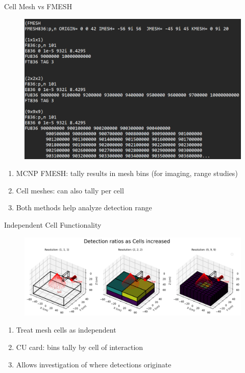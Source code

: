 \documentclass[10pt,hyperref={colorlinks,citecolor=blue,urlcolor=peking_blue,linkcolor=}]{beamer}
\theoremstyle{plain}
\begin{document}
\begin{frame}{Cell Mesh vs FMESH}
\begin{figure}[Cell Mesh vs FMESH code]
\begin{center}
\includegraphics[width=1\linewidth]{../Figures/MCNP/maxfmesh.png}
\end{center}
\end{figure}
\begin{enumerate}
\item MCNP FMESH: tally results in mesh bins (for imaging, range studies)
\item Cell meshes: can also tally per cell
\item Both methods help analyze detection range
\end{enumerate}
\end{frame}
\begin{frame}{Independent Cell Functionality}
\begin{figure}[Cell Ratio Mesh Detection]
\begin{center}
\includegraphics[width=1\linewidth]{../Figures/MCNP/CellRatioMesh.png}
\end{center}
\end{figure}
\begin{enumerate}
\item Treat mesh cells as independent
\item CU card: bins tally by cell of interaction
\item Allows investigation of where detections originate
\end{enumerate}
\end{frame}
\end{document}
